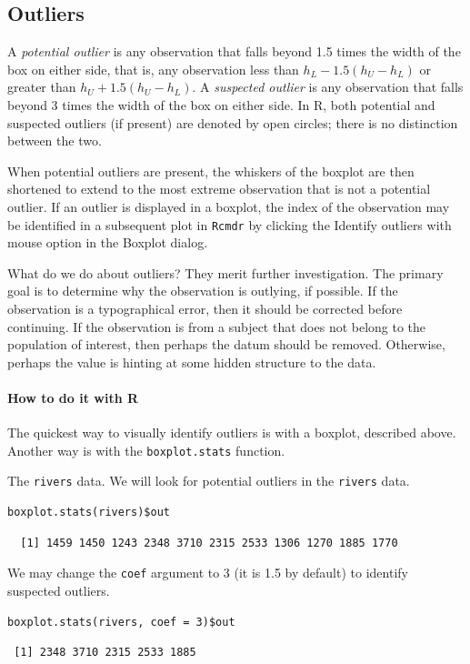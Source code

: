 \documentclass[captions=tableheading]{scrbook}
\begin{document}
\subsection{Outliers}
\label{sec-2-4-4}

\label{sub:Outliers}

A \emph{potential outlier} is any observation that falls beyond 1.5 times the width of the box on either side, that is, any observation less than \(h_{L}-1.5(h_{U}-h_{L})\) or greater than \(h_{U}+1.5(h_{U}-h_{L})\). A \emph{suspected outlier} is any observation that falls beyond 3 times the width of the box on either side. In \textsf{R}, both potential and suspected outliers (if present) are denoted by open circles; there is no distinction between the two. 

When potential outliers are present, the whiskers of the boxplot are then shortened to extend to the most extreme observation that is not a potential outlier. If an outlier is displayed in a boxplot, the index of the observation may be identified in a subsequent plot in \texttt{Rcmdr} by clicking the \textsf{Identify outliers with mouse} option in the \textsf{Boxplot} dialog.

What do we do about outliers? They merit further investigation. The primary goal is to determine why the observation is outlying, if possible. If the observation is a typographical error, then it should be corrected before continuing. If the observation is from a subject that does not belong to the population of interest, then perhaps the datum should be removed. Otherwise, perhaps the value is hinting at some hidden structure to the data.

\paragraph*{How to do it with \textsf{R}}

The quickest way to visually identify outliers is with a boxplot, described above. Another way is with the \texttt{boxplot.stats} function.

\begin{example}
The \texttt{rivers} data. We will look for potential outliers in the \texttt{rivers} data.


\begin{verbatim}
boxplot.stats(rivers)$out
\end{verbatim}

\begin{verbatim}
  [1] 1459 1450 1243 2348 3710 2315 2533 1306 1270 1885 1770
\end{verbatim}

We may change the \texttt{coef} argument to 3 (it is 1.5 by default) to identify suspected outliers.


\begin{verbatim}
boxplot.stats(rivers, coef = 3)$out
\end{verbatim}

\begin{verbatim}
 [1] 2348 3710 2315 2533 1885
\end{verbatim}

\end{example}
\end{document}
